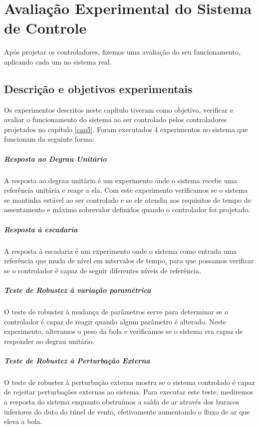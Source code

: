 \chapter{Avaliação Experimental do Sistema de Controle}\label{cap6}
Após projetar os controladores, fizemos uma avaliação do seu funcionamento, aplicando cada um no sistema real.
\section{Descrição e objetivos experimentais}
Os experimentos descritos neste capítulo tiveram como objetivo, verificar e avaliar o funcionamento do sistema ao ser controlado pelos controladores projetados no capítulo \ref{cap5}. Foram executados 4 experimentos no sistema que funcionam da seguinte forma:
\paragraph{Resposta ao Degrau Unitário} A resposta ao degrau unitário é um experimento onde o sistema recebe uma referência unitária e reage a ela. Com este experimento verificamos se o sistema se mantinha estável ao ser controlado e se ele atendia aos requisitos de tempo de assentamento e máximo sobrevalor definidos quando o controlador foi projetado.
\paragraph{Resposta à escadaria} A resposta à escadaria é um experimento onde o sistema como entrada uma referência que muda de nível em intervalos de tempo, para que possamos verificar se o controlador é capaz de seguir diferentes níveis de referência.

\paragraph{Teste de Robustez à variação paramétrica}

O teste de robustez à mudança de parâmetros serve para determinar se o controlador é capaz de reagir quando algum parâmetro é alterado. Neste experimento, alteramos o peso da bola e verificamos se o sistema era capaz de responder ao degrau unitário.

\paragraph{Teste de Robustez à Perturbação Externa}
  O teste de robustez à perturbação externa mostra se o sistema controlado é capaz de rejeitar perturbações externas ao sistema. Para executar este teste, mediremos a resposta do sistema enquanto obstruímos a saída de ar através dos buracos inferiores do duto do túnel de vento, efetivamente aumentando o fluxo de ar que eleva a bola.

